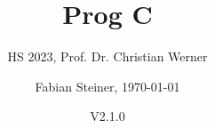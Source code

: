 \documentclass[fontsize=8pt, a4paper, fleqn, landscape, DIV=calc]{scrartcl}
\title{\vspace{-1cm}Prog C}
\subtitle{HS 2023, Prof. Dr. Christian Werner}
\author{Fabian Steiner, \today}
\date{{\small V2.1.0}}
\begin{document}
	\begin{multicols*}{3}
        \raggedcolumns
        \begin{minipage}{0.75\columnwidth}
		      \maketitle
        \end{minipage}
        \begin{minipage}{0.2\columnwidth}
            \begin{center}
                \quad
                \qquad    
            \end{center}
        \end{minipage}
        
        \thispagestyle{fancy}%

        
        
        
        
        
        
        
        
        
	\end{multicols*}	
\end{document}
